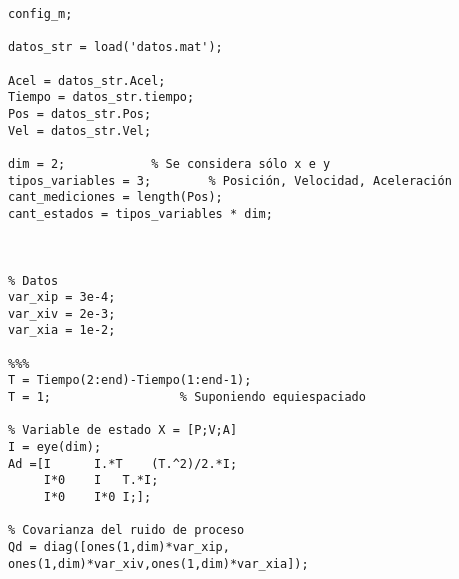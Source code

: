 	\begin{lstlisting}
config_m;

datos_str = load('datos.mat');

Acel = datos_str.Acel;
Tiempo = datos_str.tiempo;
Pos = datos_str.Pos;
Vel = datos_str.Vel;

dim = 2;			% Se considera sólo x e y
tipos_variables = 3;		% Posición, Velocidad, Aceleración
cant_mediciones = length(Pos);
cant_estados = tipos_variables * dim;



% Datos
var_xip = 3e-4;
var_xiv = 2e-3;
var_xia = 1e-2;

%%%
T = Tiempo(2:end)-Tiempo(1:end-1);	
T = 1;					% Suponiendo equiespaciado

% Variable de estado X = [P;V;A]
I = eye(dim);
Ad =[I		I.*T	(T.^2)/2.*I;
     I*0	I	T.*I;
     I*0	I*0	I;];

% Covarianza del ruido de proceso
Qd = diag([ones(1,dim)*var_xip, ones(1,dim)*var_xiv,ones(1,dim)*var_xia]);
	\end{lstlisting}






	
		
